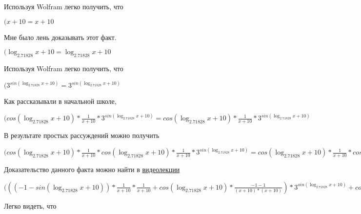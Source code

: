 \documentclass[12pt,a4paper,fleqn]{article}
\theoremstyle{definition}
\begin{document}
Используя Wolfram легко получить, что

$( x  +  10  =  x  +  10 $

Мне было лень доказывать этот факт.

$(\log_{ 2.71828 }{ x  +  10 } = \log_{ 2.71828 }{ x  +  10 }$

Используя Wolfram легко получить, что

$({ 3 }^{sin(\log_{ 2.71828 }{ x  +  10 })} = { 3 }^{sin(\log_{ 2.71828 }{ x  +  10 })}$

Как рассказывали в начальной школе,

$(cos(\log_{ 2.71828 }{ x  +  10 }) * \frac{ 1 }{ x  +  10 }
 * { 3 }^{sin(\log_{ 2.71828 }{ x  +  10 })} = cos(\log_{ 2.71828 }{ x  +  10 }) * \frac{ 1 }{ x  +  10 }
 * { 3 }^{sin(\log_{ 2.71828 }{ x  +  10 })}$

В результате простых рассуждений можно получить

$(cos(\log_{ 2.71828 }{ x  +  10 }) * \frac{ 1 }{ x  +  10 }
 * cos(\log_{ 2.71828 }{ x  +  10 }) * \frac{ 1 }{ x  +  10 }
 * { 3 }^{sin(\log_{ 2.71828 }{ x  +  10 })} = cos(\log_{ 2.71828 }{ x  +  10 }) * \frac{ 1 }{ x  +  10 }
 * cos(\log_{ 2.71828 }{ x  +  10 }) * \frac{ 1 }{ x  +  10 }
 * { 3 }^{sin(\log_{ 2.71828 }{ x  +  10 })}$

Доказательство данного факта можно найти в \href{https://www.youtube.com/watch?v=dQw4w9WgXcQ}{видеолекции}

$((( -1  - sin(\log_{ 2.71828 }{ x  +  10 })) * \frac{ 1 }{ x  +  10 }
 * \frac{ 1 }{ x  +  10 }
 + cos(\log_{ 2.71828 }{ x  +  10 }) * \frac{ -1  -  1 }{( x  +  10 ) * ( x  +  10 )}
) * { 3 }^{sin(\log_{ 2.71828 }{ x  +  10 })} + cos(\log_{ 2.71828 }{ x  +  10 }) * \frac{ 1 }{ x  +  10 }
 * cos(\log_{ 2.71828 }{ x  +  10 }) * \frac{ 1 }{ x  +  10 }
 * { 3 }^{sin(\log_{ 2.71828 }{ x  +  10 })} = (( -1  - sin(\log_{ 2.71828 }{ x  +  10 })) * \frac{ 1 }{ x  +  10 }
 * \frac{ 1 }{ x  +  10 }
 + cos(\log_{ 2.71828 }{ x  +  10 }) * \frac{ -1  -  1 }{( x  +  10 ) * ( x  +  10 )}
) * { 3 }^{sin(\log_{ 2.71828 }{ x  +  10 })} + cos(\log_{ 2.71828 }{ x  +  10 }) * \frac{ 1 }{ x  +  10 }
 * cos(\log_{ 2.71828 }{ x  +  10 }) * \frac{ 1 }{ x  +  10 }
 * { 3 }^{sin(\log_{ 2.71828 }{ x  +  10 })}$

Легко видеть, что
\end{document}

